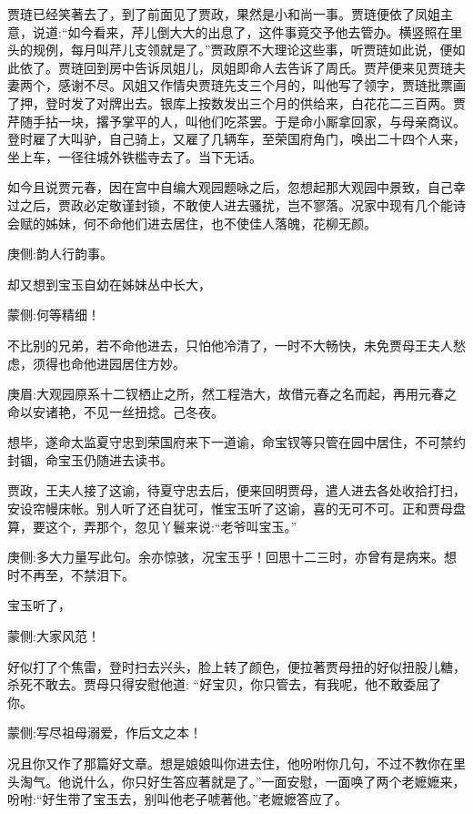 \begin{parag}
    贾琏已经笑著去了，到了前面见了贾政，果然是小和尚一事。贾琏便依了凤姐主意，说道:“如今看来，芹儿倒大大的出息了，这件事竟交予他去管办。横竖照在里头的规例，每月叫芹儿支领就是了。”贾政原不大理论这些事，听贾琏如此说，便如此依了。贾琏回到房中告诉凤姐儿，凤姐即命人去告诉了周氏。贾芹便来见贾琏夫妻两个，感谢不尽。风姐又作情央贾琏先支三个月的，叫他写了领字，贾琏批票画了押，登时发了对牌出去。银库上按数发出三个月的供给来，白花花二三百两。贾芹随手拈一块，撂予掌平的人，叫他们吃茶罢。于是命小厮拿回家，与母亲商议。登时雇了大叫驴，自己骑上，又雇了几辆车，至荣国府角门，唤出二十四个人来，坐上车，一径往城外铁槛寺去了。当下无话。
\end{parag}


\begin{parag}
    如今且说贾元春，因在宫中自编大观园题咏之后，忽想起那大观园中景致，自己幸过之后，贾政必定敬谨封锁，不敢使人进去骚扰，岂不寥落。况家中现有几个能诗会赋的姊妹，何不命他们进去居住，也不使佳人落魄，花柳无颜。\begin{note}庚侧:韵人行韵事。\end{note}却又想到宝玉自幼在姊妹丛中长大，\begin{note}蒙侧:何等精细！\end{note}不比别的兄弟，若不命他进去，只怕他冷清了，一时不大畅快，未免贾母王夫人愁虑，须得也命他进园居住方妙。\begin{note}庚眉:大观园原系十二钗栖止之所，然工程浩大，故借元春之名而起，再用元春之命以安诸艳，不见一丝扭捻。己冬夜。\end{note}想毕，遂命太监夏守忠到荣国府来下一道谕，命宝钗等只管在园中居住，不可禁约封锢，命宝玉仍随进去读书。
\end{parag}


\begin{parag}
    贾政，王夫人接了这谕，待夏守忠去后，便来回明贾母，遣人进去各处收拾打扫，安设帘幔床帐。别人听了还自犹可，惟宝玉听了这谕，喜的无可不可。正和贾母盘算，要这个，弄那个，忽见丫鬟来说:“老爷叫宝玉。”\begin{note}庚侧:多大力量写此句。余亦惊骇，况宝玉乎！回思十二三时，亦曾有是病来。想时不再至，不禁泪下。\end{note}宝玉听了，\begin{note}蒙侧:大家风范！\end{note}好似打了个焦雷，登时扫去兴头，脸上转了颜色，便拉著贾母扭的好似扭股儿糖，杀死不敢去。贾母只得安慰他道: “好宝贝，你只管去，有我呢，他不敢委屈了你。\begin{note}蒙侧:写尽祖母溺爱，作后文之本！\end{note}况且你又作了那篇好文章。想是娘娘叫你进去住，他吩咐你几句，不过不教你在里头淘气。他说什么，你只好生答应著就是了。”一面安慰，一面唤了两个老嬷嬷来，吩咐:“好生带了宝玉去，别叫他老子唬著他。”老嬷嬷答应了。
\end{parag}


